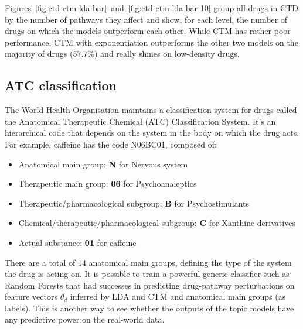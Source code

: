 \documentclass[12pt,a4paper,twoside,openright]{report}
\begin{document}

Figures~\ref{fig:ctd-ctm-lda-bar}~and~\ref{fig:ctd-ctm-lda-bar-10} group all drugs in CTD by the number of pathways they affect and show, for each level, the number of drugs on which the models outperform each other. While CTM has rather poor performance, CTM with exponentiation outperforms the other two models on the majority of drugs (57.7\%) and really shines on low-density drugs.

\subsection{ATC classification}

The World Health Organisation maintains a classification system for drugs called the Anatomical Therapeutic Chemical (ATC) Classification System. It's an hierarchical code that depends on the system in the body on which the drug acts. For example, caffeine has the code N06BC01, composed of:

\begin{itemize}[noitemsep]
\item Anatomical main group: \textbf{N} for Nervous system
\item Therapeutic main group: \textbf{06} for Psychoanaleptics
\item Therapeutic/pharmacological subgroup: \textbf{B} for Psychostimulants
\item Chemical/therapeutic/pharmacological subgroup: \textbf{C} for Xanthine derivatives
\item Actual substance: \textbf{01} for caffeine
\end{itemize}

There are a total of 14 anatomical main groups, defining the type of the system the drug is acting on. It is possible to train a powerful generic classifier such as Random Forests\cite{Breiman:2001:RF:570181.570182} that had successes in predicting drug-pathway perturbations\cite{Riddick15012011} on feature vectors $\theta_d$ inferred by LDA and CTM and anatomical main groups (as labels). This is another way to see whether the outputs of the topic models have any predictive power on the real-world data.
\end{document}
